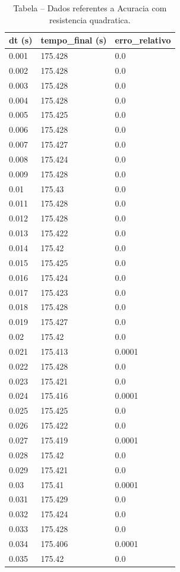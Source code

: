 \begin{table}[H]
\centering
\caption{Tabela – Dados referentes a Acuracia com resistencia quadratica.}
\label{tab:acuracia_com_resistencia_quadratica}
\begin{tabular}{lll}
\toprule
dt (s) & tempo\_final (s) & erro\_relativo \\
\midrule
0.001 & 175.428 & 0.0 \\
0.002 & 175.428 & 0.0 \\
0.003 & 175.428 & 0.0 \\
0.004 & 175.428 & 0.0 \\
0.005 & 175.425 & 0.0 \\
0.006 & 175.428 & 0.0 \\
0.007 & 175.427 & 0.0 \\
0.008 & 175.424 & 0.0 \\
0.009 & 175.428 & 0.0 \\
0.01 & 175.43 & 0.0 \\
0.011 & 175.428 & 0.0 \\
0.012 & 175.428 & 0.0 \\
0.013 & 175.422 & 0.0 \\
0.014 & 175.42 & 0.0 \\
0.015 & 175.425 & 0.0 \\
0.016 & 175.424 & 0.0 \\
0.017 & 175.423 & 0.0 \\
0.018 & 175.428 & 0.0 \\
0.019 & 175.427 & 0.0 \\
0.02 & 175.42 & 0.0 \\
0.021 & 175.413 & 0.0001 \\
0.022 & 175.428 & 0.0 \\
0.023 & 175.421 & 0.0 \\
0.024 & 175.416 & 0.0001 \\
0.025 & 175.425 & 0.0 \\
0.026 & 175.422 & 0.0 \\
0.027 & 175.419 & 0.0001 \\
0.028 & 175.42 & 0.0 \\
0.029 & 175.421 & 0.0 \\
0.03 & 175.41 & 0.0001 \\
0.031 & 175.429 & 0.0 \\
0.032 & 175.424 & 0.0 \\
0.033 & 175.428 & 0.0 \\
0.034 & 175.406 & 0.0001 \\
0.035 & 175.42 & 0.0 \\

\end{tabular}
\end{table}

